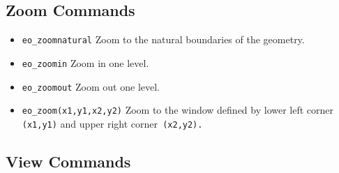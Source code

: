 


\subsection{Zoom Commands}

\begin{itemize}
\item \texttt{eo\_zoomnatural} Zoom to the natural boundaries of the geometry.

\item \texttt{eo\_zoomin} Zoom in one level.

\item \texttt{eo\_zoomout} Zoom out one level.

\item \texttt{eo\_zoom(x1,y1,x2,y2)} Zoom to the window defined by lower left corner
\texttt{(x1,y1)} and upper right corner\texttt{ (x2,y2).}
\end{itemize}



\subsection{View Commands}


